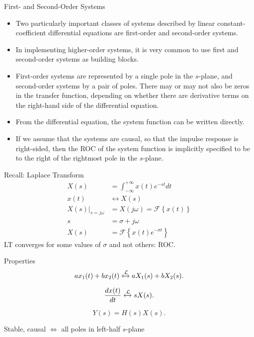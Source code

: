 \begin{frame}{First- and Second-Order Systems}
    \begin{itemize}
        \item Two particularly important classes of systems described by linear constant-coefficient differential equations are first-order and second-order systems.
        \item In implementing higher-order systems, it is very common to use first and second-order systems as building blocks.
        \item First-order systems are represented by a single pole in the $s$-plane, and second-order systems by a pair of poles. There may or may not also be zeros in the transfer function, depending on whether there are derivative terms on the right-hand side of the differential equation.
        \item From the differential equation, the system function can be written directly.
        \item If we assume that the systems are causal, so that the impulse response is right-sided, then the ROC of the system function is implicitly specified to be to the right of the rightmost pole in the $s$-plane.
    \end{itemize}
\end{frame}

\begin{frame}{Recall: Laplace Transform}
    \begin{align*}
        X(s) &= \int_{-\infty}^{+\infty}x(t)e^{-st}dt\\
        x(t) &\leftrightarrow X(s)\\
        \left.X(s)\right|_{s=j\omega} &= X(j\omega) = \mathcal{F}\left\{ x(t)\right\}\\
        s &= \sigma + j\omega\\
         X(s) &= \mathcal{F}\left\{ x(t)e^{-\sigma t}\right\}
    \end{align*}
    LT converges for some values of $\sigma$ and not others: ROC.
\end{frame}


\begin{frame}{Properties}
    \begin{equation*}
        ax_1(t) + bx_2(t) \xleftrightarrow{\mathcal{L}} aX_1(s) + bX_2(s).
    \end{equation*}

    \begin{equation*}
        \frac{dx(t)}{dt} \xleftrightarrow{\mathcal{L}} sX(s).
    \end{equation*}
    \begin{center}
        
    \end{center}


    \begin{equation*}
        Y(s) = H(s)X(s).
    \end{equation*}

    Stable, causal $\Leftrightarrow$ all poles in left-half $s$-plane
\end{frame}

